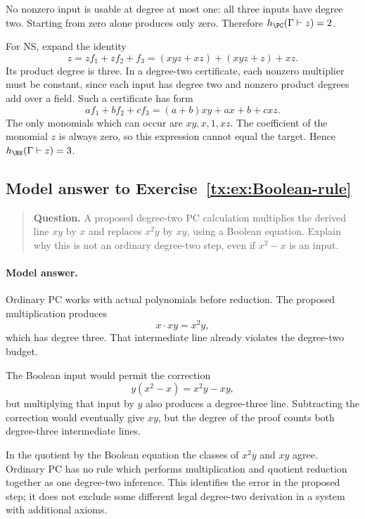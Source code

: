 No nonzero input is usable at degree at most one: all three inputs
have degree two. Starting from zero alone produces only zero.
Therefore \(h_{\PC}(\Gamma\vdash z)=2\).

For NS, expand the identity
\[
 z=zf_1+zf_2+f_3
   =(xyz+xz)+(xyz+z)+xz.
\]
Its product degree is three. In a degree-two certificate, each nonzero
multiplier must be constant, since each input has degree two and
nonzero product degrees add over a field. Such a certificate has form
\[
 af_1+bf_2+cf_3=(a+b)xy+ax+b+cxz.
\]
The only monomials which can occur are \(xy,x,1,xz\). The coefficient
of the monomial \(z\) is always zero, so this expression cannot equal
the target. Hence \(h_{\NS}(\Gamma\vdash z)=3\).


\par


\begin{samepage}

\subsection*{Model answer to Exercise~\ref{tx:ex:Boolean-rule}}\label{tx:ans:Boolean-rule}

\begin{quote}\small\textbf{Question.} A proposed degree-two PC calculation multiplies the derived line $xy$
by $x$ and replaces $x^2y$ by $xy$, using a Boolean equation. Explain
why this is not an ordinary degree-two step, even if $x^2-x$ is an input.
\end{quote}

\paragraph{Model answer.}
Ordinary PC works with actual polynomials before reduction. The
proposed multiplication produces
\[
                         x\cdot xy=x^2y,
\]
which has degree three. That intermediate line already violates the
degree-two budget.
\end{samepage}

The Boolean input would permit the correction
\[
                 y(x^2-x)=x^2y-xy,
\]
but multiplying that input by \(y\) also produces a degree-three line.
Subtracting the correction would eventually give \(xy\), but the
degree of the proof counts both degree-three intermediate lines.

In the quotient by the Boolean equation the classes of \(x^2y\)
and \(xy\) agree. Ordinary PC has no rule which performs multiplication
and quotient reduction together as one degree-two inference.
This identifies the error in the proposed step; it does not exclude
some different legal degree-two derivation in a system with additional axioms.


